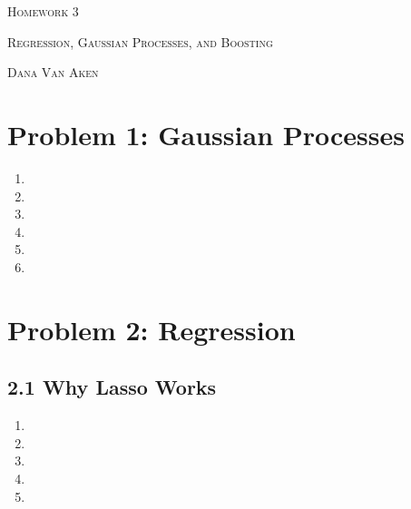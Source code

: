\documentclass{article}
\begin{document}
\section*{}
\begin{center}
  \centerline{\textsc{\LARGE Homework 3}}
  \vspace{0.5em}
  \centerline{\textsc{Regression, Gaussian Processes, and Boosting}}
  \vspace{1em}
  \textsc{\large Dana Van Aken} \\
\end{center}

\section*{Problem 1: Gaussian Processes}

\begin{enumerate}[label=(\alph*)]

\item %

\item %

\item %

\item %

\item %

\item %

\end{enumerate}

\section*{Problem 2: Regression}

\subsection*{2.1 Why Lasso Works}

\begin{enumerate}
<<<<<<< HEAD

\item %

\item %

\item %

\item %

\item %

\end{enumerate}
\end{document}
